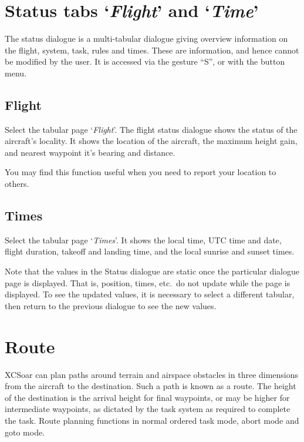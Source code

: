 \section{Status tabs `\emph{Flight}' and `\emph{Time}'}\label{sec:flight-status}

The status dialogue is a multi-tabular dialogue giving overview information on the 
flight, system, task, rules and times.
These are information, and hence cannot be modified by the user.
It is accessed via the gesture ``S'', or with the button menu.
\begin{quote}
\blink{}
\end{quote}

\subsection*{Flight}
Select the tabular page `\emph{Flight}'. 
The flight status dialogue shows the status of the aircraft's locality.
It shows the location of the aircraft, the
maximum height gain, and nearest waypoint it's bearing and distance.

You may find this function useful when you need to report your
location to others.

\subsection*{Times}\label{sec:time-status}
Select the tabular page `\emph{Times}'. 
It shows the local time, UTC time and date, flight duration, takeoff and landing time, and
the local sunrise and sunset times.

Note that the values in the Status dialogue 
are static once the particular dialogue page is displayed. 
That is, position, times, etc.\ do not update while the page is displayed.
To see the updated values, it is necessary to select a different tabular, 
then return to the previous dialogue to see the new values.


\section{Route}\label{sec:route}

XCSoar can plan paths around terrain and airspace obstacles in three
dimensions from the aircraft to the destination.  Such a path is known
as a route.  The height of the destination is the arrival height for
final waypoints, or may be higher for intermediate waypoints, as
dictated by the task system as required to complete the task.  Route
planning functions in normal ordered task mode, abort mode and goto
mode.

